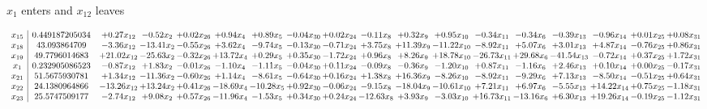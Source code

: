 \documentclass[9pt]{article}
\begin{document}
 $ x_{1} $ enters and $ x_{12} $ leaves 

 \[\begin{array}{c| c c@{\hskip 2pt} c@{\hskip 2pt} c@{\hskip 2pt} c@{\hskip 2pt} c@{\hskip 2pt} c@{\hskip 2pt} c@{\hskip 2pt} c@{\hskip 2pt} c@{\hskip 2pt} c@{\hskip 2pt} c@{\hskip 2pt} c@{\hskip 2pt} c@{\hskip 2pt} c@{\hskip 2pt} c@{\hskip 2pt} c@{\hskip 2pt} }
 x_{15}   &  0.449187205034 & +  0.27 x_{12} & -0.52 x_{2} & +  0.02 x_{26} & +  0.94 x_{4} & +  0.89 x_{5} & -0.04 x_{30} & +  0.02 x_{24} & -0.11 x_{8} & +  0.32 x_{9} & +  0.95 x_{10} & -0.34 x_{11} & -0.34 x_{6} & -0.39 x_{13} & -0.96 x_{14} & +  0.01 x_{25} & +  0.08 x_{31}\\
 x_{18}   &  43.093864709 & -3.36 x_{12} & -13.41 x_{2} & -0.55 x_{26} & +  3.62 x_{4} & -9.74 x_{5} & -0.13 x_{30} & -0.71 x_{24} & +  3.75 x_{8} & + 11.39 x_{9} & -11.22 x_{10} & -8.92 x_{11} & +  5.07 x_{6} & +  3.01 x_{13} & +  4.87 x_{14} & -0.76 x_{25} & +  0.86 x_{31}\\
 x_{19}   &  49.7796014683 & + 21.02 x_{12} & -25.63 x_{2} & -0.32 x_{26} & + 13.72 x_{4} & +  0.29 x_{5} & +  0.35 x_{30} & -1.72 x_{24} & +  0.96 x_{8} & +  8.26 x_{9} & + 18.78 x_{10} & -26.73 x_{11} & + 29.68 x_{6} & -41.54 x_{13} & -0.72 x_{14} & +  0.37 x_{25} & +  1.72 x_{31}\\
 x_{1}   &  0.232905086523 & -0.87 x_{12} & +  1.83 x_{2} & -0.01 x_{26} & -1.10 x_{4} & -1.11 x_{5} & -0.04 x_{30} & +  0.11 x_{24} & -0.09 x_{8} & -0.36 x_{9} & -1.20 x_{10} & +  0.87 x_{11} & -1.16 x_{6} & +  2.46 x_{13} & +  0.10 x_{14} & +  0.00 x_{25} & -0.17 x_{31}\\
 x_{21}   &  51.5675930781 & +  1.34 x_{12} & -11.36 x_{2} & -0.60 x_{26} & +  1.14 x_{4} & -8.61 x_{5} & -0.64 x_{30} & +  0.16 x_{24} & +  1.38 x_{8} & + 16.36 x_{9} & -8.26 x_{10} & -8.92 x_{11} & -9.29 x_{6} & +  7.13 x_{13} & -8.50 x_{14} & -0.51 x_{25} & +  0.64 x_{31}\\
 x_{22}   &  24.1380964866 & -13.26 x_{12} & + 13.24 x_{2} & +  0.41 x_{26} & -18.69 x_{4} & -10.28 x_{5} & +  0.92 x_{30} & -0.06 x_{24} & -9.15 x_{8} & -18.04 x_{9} & -10.61 x_{10} & +  7.21 x_{11} & +  6.97 x_{6} & -5.55 x_{13} & + 14.22 x_{14} & +  0.75 x_{25} & -1.18 x_{31}\\
 x_{23}   &  25.5747509177 & -2.74 x_{12} & +  9.08 x_{2} & +  0.57 x_{26} & -11.96 x_{4} & -1.53 x_{5} & +  0.34 x_{30} & +  0.24 x_{24} & -12.63 x_{8} & +  3.93 x_{9} & -3.03 x_{10} & + 16.73 x_{11} & -13.16 x_{6} & +  6.30 x_{13} & + 19.26 x_{14} & -0.19 x_{25} & -1.12 x_{31}\\

\end{array}\]
\end{document}
